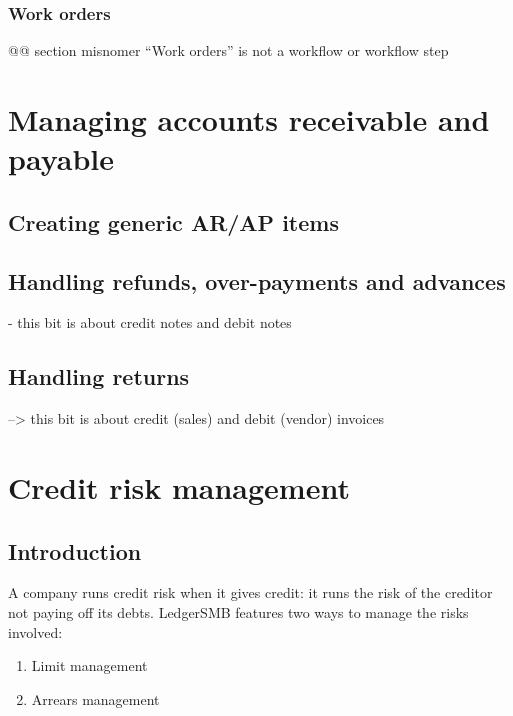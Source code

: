 \subsection{Work orders}
\label{sec-business-processes-manufacturing-work-orders}

@@ section misnomer ``Work orders'' is not a workflow or workflow step

\chapter{Managing accounts receivable and payable}
\label{cha-business-processes-managing-ar/ap}

\section{Creating generic AR/AP items}
\label{sec-business-processes-managing-ar/ap-item-creation}

\section{Handling refunds, over-payments and advances}
\label{sec-business-processes-managing-ar/ap-overpayments}

- this bit is about credit notes and debit notes

\section{Handling returns}
\label{sec-business-processes-managing-ar/ap-returns}

--> this bit is about credit (sales) and debit (vendor) invoices

\chapter{Credit risk management}
\label{cha-credit-risk-management}

\section{Introduction}
\label{sec-credit-risk-management-introduction}

A company runs credit risk when it gives credit: it runs the risk of the
creditor not paying off its debts.  LedgerSMB features two ways to manage
the risks involved:

\begin{enumerate}
\item Limit management
\item Arrears management
\end{enumerate}

